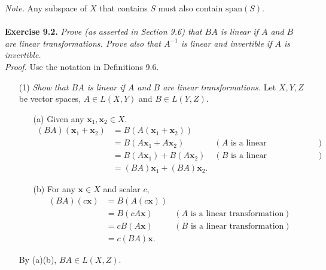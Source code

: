 \documentclass{article}
\begin{document}
\emph{Note.}
Any subspace of $X$ that contains $S$ must also contain $\mathrm{span}(S)$. \\\\






\textbf{Exercise 9.2.}
\emph{Prove (as asserted in Section 9.6) that $BA$ is linear
if $A$ and $B$ are linear transformations.
Prove also that $A^{-1}$ is linear and invertible if $A$ is invertible.} \\

\emph{Proof.}
Use the notation in Definitions 9.6.
\begin{enumerate}
\item[(1)]
  \emph{Show that $BA$ is linear if $A$ and $B$ are linear transformations.}
  Let $X, Y, Z$ be vector spaces, $A \in L(X,Y)$ and $B \in L(Y,Z)$.
  \begin{enumerate}
  \item[(a)]
    Given any $\mathbf{x}_1, \mathbf{x}_2 \in X$.
    \begin{align*}
      (BA)(\mathbf{x}_1+\mathbf{x}_2)
      &= B(A(\mathbf{x}_1+\mathbf{x}_2)) \\
      &= B(A\mathbf{x}_1+A\mathbf{x}_2)
        & (\text{$A$ is a linear transformation}) \\
      &= B(A\mathbf{x}_1) + B(A\mathbf{x}_2)
        & (\text{$B$ is a linear transformation}) \\
      &= (BA)\mathbf{x}_1 + (BA)\mathbf{x}_2.
    \end{align*}

  \item[(b)]
    For any $\mathbf{x} \in X$ and scalar $c$,
    \begin{align*}
    (BA)(c\mathbf{x})
    &= B(A(c\mathbf{x})) \\
    &= B(cA\mathbf{x})
      & (\text{$A$ is a linear transformation}) \\
    &= cB(A\mathbf{x})
      & (\text{$B$ is a linear transformation}) \\
    &= c(BA)\mathbf{x}.
    \end{align*}
  \end{enumerate}
  By (a)(b), $BA \in L(X,Z)$.


\end{enumerate}
\end{document}
